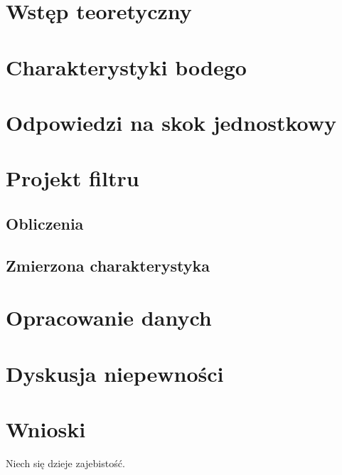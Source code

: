 \documentclass[a4paper,11pt]{article}
\begin{document}
\section{Wstęp teoretyczny}

\section{Charakterystyki bodego}

\section{Odpowiedzi na skok jednostkowy}

\section{Projekt filtru}
\subsection{Obliczenia}

\subsection{Zmierzona charakterystyka}

\section{Opracowanie danych}

\section{Dyskusja niepewności}

\section{Wnioski}


Niech się dzieje zajebistość.
\end{document}

